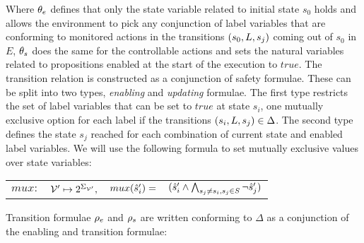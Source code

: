 Where ${\theta_e}$ defines that only the state variable related to initial state $s_0$ holds and allows the environment to pick any conjunction of label variables that are conforming to monitored actions in the transitions $(s_0, L, s_j)$ coming out of $s_0$ in $E$, ${\theta_s}$ does the same for the controllable actions and sets the natural variables related to propositions enabled at the start of the execution to $true$.
The transition relation is constructed as a conjunction of safety formulae. These can be split into two types, \emph{enabling} and \emph{updating} formulae. The first type restricts the set of label variables that can be set to $true$ at state $s_i$, one mutually exclusive option for each label \actionLabel if the transitions $(s_i,L,s_j) \in \Delta$. The second type defines the state $s_j$ reached for each combination of current state and enabled label variables. 
We will use the following formula to set mutually exclusive values over state variables:

\begin{center}
	\begin{tabular}{r r r l}
$mux:$&${\mathcal{V}}' \mapsto 2^{\Sigma_{{\mathcal{V}}'}},$&$mux(\hat{s}_{i}') = $&$(\hat{s}_{i}' \wedge\bigwedge_{s_j \neq s_i, s_j \in S}\neg \hat{s}_{j}')$
	\end{tabular}
\end{center}

Transition formulae ${\rho_e}$ and ${\rho_s}$ are written conforming to $\Delta$ as a conjunction of the enabling and transition formulae:

